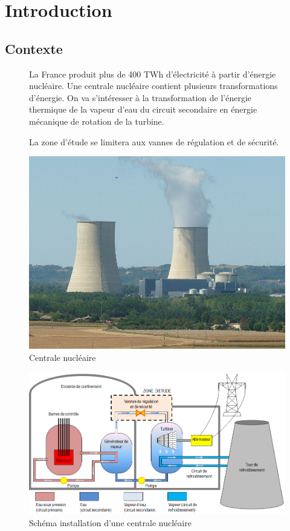 

\section{Introduction}

\subsection{Contexte}

\begin{figure}[ht!]
\begin{minipage}{0.6\linewidth}
La France produit plus de 400 TWh d'électricité à partir d'énergie nucléaire. Une centrale nucléaire contient plusieurs transformations d'énergie. On va s'intéresser à la transformation de l'énergie thermique de la vapeur d'eau du circuit secondaire en énergie mécanique de rotation de la turbine.

La zone d'étude se limitera aux vannes de régulation et de sécurité. 
\end{minipage}
\hfill
\begin{minipage}{0.36\linewidth}
\begin{center}
 \includegraphics[width=0.7\linewidth]{img/fig01}
\end{center}
\caption{Centrale nucléaire}
\label{fig01}
\end{minipage}
\end{figure}

\begin{figure}[ht!]
\begin{center}
 \includegraphics[width=0.8\linewidth]{img/fig02}
\end{center}
\caption{Schéma installation d'une centrale nucléaire}
\label{fig02}
\end{figure}

